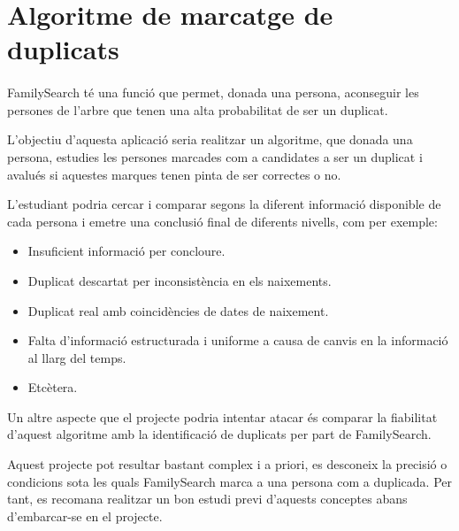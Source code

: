 \section{Algoritme de marcatge de duplicats}

    \paragraph{}
    FamilySearch té una funció que permet, donada una persona, aconseguir les persones de l'arbre que tenen una alta probabilitat de ser un duplicat.

    L'objectiu d'aquesta aplicació seria realitzar un algoritme, que donada una persona, estudies les persones marcades com a candidates a ser un duplicat  i avalués si aquestes marques tenen pinta de ser correctes o no.

    L'estudiant podria cercar i comparar segons la diferent informació disponible de cada persona i emetre una conclusió final de diferents nivells, com per exemple:

    \begin{itemize}
        \item Insuficient informació per concloure.
        \item Duplicat descartat per inconsistència en els naixements.
        \item Duplicat real amb coincidències de dates de naixement.
        \item Falta d'informació estructurada i uniforme a causa de canvis en la informació al llarg del temps.
        \item Etcètera.
    \end{itemize}

    Un altre aspecte que el projecte podria intentar atacar és comparar la fiabilitat d'aquest algoritme amb la identificació de duplicats per part de FamilySearch.

    Aquest projecte pot resultar bastant complex i a priori, es desconeix la precisió o condicions sota les quals FamilySearch marca a una persona com a duplicada. Per tant, es recomana realitzar un bon estudi previ d'aquests conceptes abans d'embarcar-se en el projecte.

